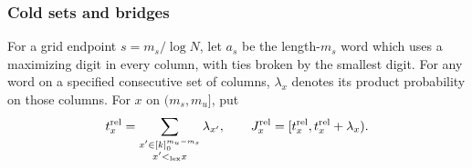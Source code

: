 \documentclass[11pt]{article}
\numberwithin{equation}{section}
\theoremstyle{definition}
\theoremstyle{remark}
\newcommand{\1}{\mathbf 1}
\begin{document}
\subsubsection{Cold sets and bridges}

For a grid endpoint $s=m_s/\log N$, let $a_s$ be the length-$m_s$ word
which uses a maximizing digit in every column, with ties broken by the
smallest digit. For any word on a specified consecutive set of columns,
$\lambda_x$ denotes its product probability on those columns.
For $x$ on $(m_s,m_u]$, put
\[
 t_x^{\rm rel}=\sum_{\substack{x'\in[k]_0^{m_u-m_s}\\x'<_{\rm lex}x}}
                \lambda_{x'},\qquad
 J_x^{\rm rel}=[t_x^{\rm rel},t_x^{\rm rel}+\lambda_x).
\]

\end{document}
